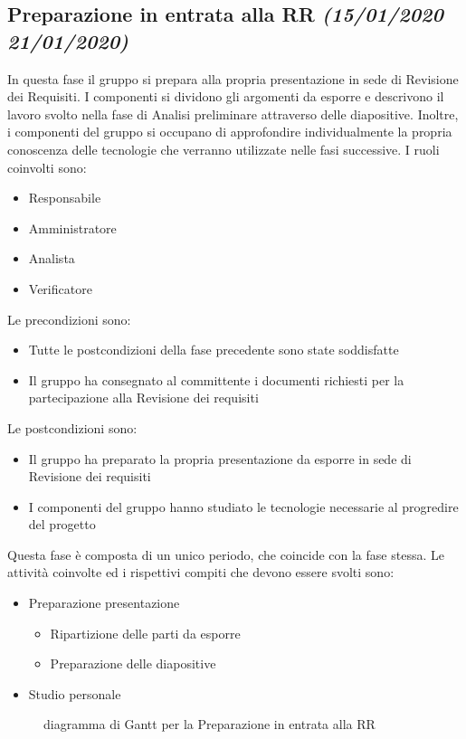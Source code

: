 \documentclass[../piano-di-progetto.tex]{subfiles}
\begin{document}
\subsection[Preparazione in entrata alla RR]{Preparazione in entrata alla RR {\normalsize\normalfont\itshape(15/01/2020  21/01/2020)}}%
\label{sub:preparazione_in_entrata_alla_rr}
In questa fase il gruppo si prepara alla propria presentazione in sede di Revisione dei Requisiti.
I componenti si dividono gli argomenti da esporre e descrivono il lavoro svolto nella fase di Analisi preliminare attraverso delle diapositive.
Inoltre, i componenti del gruppo si occupano di approfondire individualmente la propria conoscenza delle tecnologie che verranno utilizzate nelle fasi successive.
I ruoli coinvolti sono:
\begin{itemize}
  \item Responsabile
  \item Amministratore
  \item Analista
  \item Verificatore
\end{itemize}
Le precondizioni sono:
\begin{itemize}
  \item Tutte le postcondizioni della fase precedente sono state soddisfatte
  \item Il gruppo ha consegnato al committente i documenti richiesti per la partecipazione alla Revisione dei requisiti
\end{itemize}
Le postcondizioni sono:
\begin{itemize}
  \item Il gruppo ha preparato la propria presentazione da esporre in sede di Revisione dei requisiti
  \item I componenti del gruppo hanno studiato le tecnologie necessarie al progredire del progetto
\end{itemize}
Questa fase è composta di un unico periodo, che coincide con la fase stessa.
Le attività coinvolte ed i rispettivi compiti che devono essere svolti sono:
\begin{itemize}
  \item Preparazione presentazione
  \begin{itemize}
    \item Ripartizione delle parti da esporre
    \item Preparazione delle diapositive
  \end{itemize}
  \item Studio personale 
\end{itemize}
\begin{figure}[H]
  \centering
  
  \caption{diagramma di Gantt per la Preparazione in entrata alla RR}
  \label{fig:gantt_preparazione_rr}
\end{figure}
\end{document}
